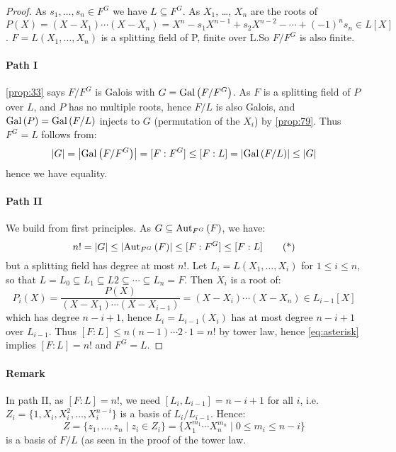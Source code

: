 \begin{proof}
  As $s_1, \ldots, s_n \in F^G$ we have $L \subseteq F^G$. As $X_1$, \ldots, $X_n$ are the roots of $P(X) = (X-X_1)\cdots{}(X-X_n) = X^n-s_1X^{n-1}+s_2X^{n-2}-\cdots{}+(-1)^ns_n \in L[X]$. $F = L(X_1, \ldots, X_n)$ is a splitting field of P, finite over L.So $F/F^G$ is also finite.

\paragraph{Path I}
 \autoref{prop:33} says $F/F^G$ is Galois with $G = \Gal{F/F^G}$. As $F$ is a splitting field of $P$ over $L$, and $P$ has no multiple roots, hence $F/L$ is also Galois, and $\Gal{P} = \Gal{F/L}$ injects to $G$ (permutation of the $X_i$) by \autoref{prop:79}. Thus $F^G = L$ follows from:
\[
\card{G} = \card{\Gal{F/F^G}} = [F : F^G] \leq [F : L] = \card{\Gal{F/L}} \leq \card{G}
\]
hence we have equality.

\paragraph{Path II}

We build from first principles. As $G \subseteq \autset[F^G]{F}$, we have:
\[
n! = \card{G} \leq \card{\autset[F^G]{F}} \leq [F : F^G] \leq [F : L] \label{eq:asterisk} \tag{*}
\]
but a splitting field has degree at most $n!$. Let $L_i = L(X_1, \ldots, X_i)$ for $1 \leq i \leq n$, so that $L = L_0 \subseteq L_1 \subseteq L2 \subseteq \cdots \subseteq L_n = F$. Then $X_i$ is a root of:
\[
P_i(X) = \frac{P(X)}{(X-X_1)\cdots{}(X-X_{i-1})} = (X-X_i)\cdots{}(X-X_n) \in L_{i-1}[X] \label{eq:star} \tag{$\star$}
\]
which has degree $n-i+1$, hence $L_i = L_{i-1}(X_i)$ has at most degree $n-i+1$ over $L_{i-1}$. Thus $[F : L] \leq n(n-1)\cdots{}2\cdot{}1 = n!$ by tower law, hence \eqref{eq:asterisk} implies $[F : L] = n!$ and $F^G = L$.
\end{proof}

\paragraph{Remark}

In path II, as $[F : L] = n!$, we need $[L_i, L_{i-1}] = n - i + 1$ for all $i$, i.e. $Z_i = \{ 1, X_i, X_i^2, \ldots, X_i^{n-i} \}$ is a basis of $L_i/L_{i-1}$. Hence:
\[
Z = \{ z_1, \ldots, z_n \mid z_i \in Z_i \} = \{ X_1^{m_1}\cdots{}X_n^{m_n} \mid 0 \leq m_i \leq n-i \}
\]
is a basis of $F/L$ (as seen in the proof of the tower law.

